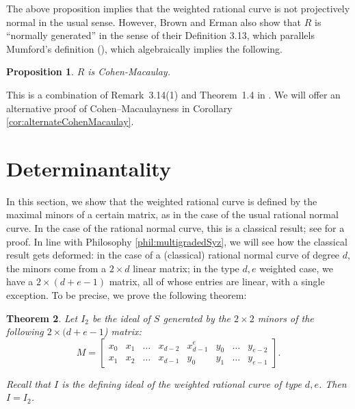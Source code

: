 \documentclass[12pt,reqno]{amsart}
\newtheorem{theorem}{Theorem}[section]
\newtheorem{proposition}[theorem]{Proposition}
\theoremstyle{definition}
\theoremstyle{remark}
\begin{document}
The above proposition implies that the weighted rational curve is not projectively normal in the usual sense. However, Brown and Erman also show that $R$ is ``normally generated'' in the sense of their Definition 3.13, which parallels Mumford's definition (\cite{mVarietiesQuadraticEquations}), which algebraically implies the following.  
\begin{proposition}
\label{prop:CohenMacaulay}
\cite{beLinSyzOCurvesIWProjSp} $R$ is Cohen-Macaulay.
\end{proposition}

This is a combination of Remark~3.14(1) and Theorem~1.4 in \cite{beLinSyzOCurvesIWProjSp}.  We will offer an alternative proof of Cohen--Macaulayness in Corollary \ref{cor:alternateCohenMacaulay}.
























\section{Determinantality}
\label{sec:determinantal}

In this section, we show that the weighted rational curve is defined by the maximal minors of a certain matrix, as in the case of the usual rational normal curve.  In the case of the rational normal curve, this is a classical result; see \cite[cf.~Proposition~6.1]{eGeomOSyz} for a proof.  In line with Philosophy \ref{phil:multigradedSyz}, we will see how the classical result gets deformed:  in the case of a (classical) rational normal curve of degree $d$, the minors come from a $2\times d$ linear matrix; in the type $d,e$ weighted case, we have a $2\times (d+e-1)$ matrix, all of whose entries are linear, with a single exception.  To be precise, we prove the following theorem:

\begin{theorem}
\label{thm:determinantal}
Let $I_2$ be the ideal of $S$ generated by the $2 \times 2$ minors of the following $2 \times (d+e-1$) matrix:
\begin{equation} \label{eq:definingmatrix}
M = \begin{bmatrix}
x_0 & x_1 & \ldots & x_{d-2} & x_{d-1}^e & y_0 & \ldots & y_{e-2}\\
x_1 & x_2 & \ldots & x_{d-1} & y_0 & y_1 & \ldots & y_{e-1}
\end{bmatrix}.
\end{equation}

Recall that $I$ is the defining ideal of the weighted rational curve of type $d,e$.
Then $I = I_2$.
\end{theorem}
\end{document}
